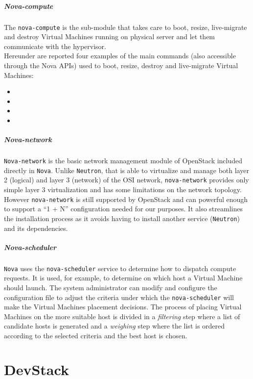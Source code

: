 \subparagraph{Nova-compute}
\label{par:openstack_nova_compute}
The \texttt{nova-compute} is the sub-module that takes care to boot, resize, live-migrate and destroy Virtual Machines running on physical server and let them communicate with the hypervisor.\\
Hereunder are reported four examples of the main commands (also accessible through the Nova APIs) used to boot, resize, destroy and live-migrate Virtual Machines:
\begin{itemize}
	\item {}
	\item {}
	\item {}
	\item {}
\end{itemize}

\subparagraph{Nova-network}
\label{par:openstack_nova_net}
\texttt{Nova-network} is the basic network management module of OpenStack included directly in \texttt{Nova}. Unlike \texttt{Neutron}, that is able to virtualize and manage both layer 2 (logical) and layer 3 (network) of the OSI network, \texttt{nova-network} provides only simple layer 3 virtualization and has some limitations on the network topology.\\
However \texttt{nova-network} is still supported by OpenStack and can powerful enough to support a ``1 + N'' configuration needed for our purposes. It also streamlines the installation process as it avoids having to install another service (\texttt{Neutron}) and its dependencies.

\subparagraph{Nova-scheduler}
\label{par:openstack_nova_sched}
\texttt{Nova} uses the \texttt{nova-scheduler} service to determine how to dispatch compute requests. It is used, for example, to determine on which host a Virtual Machine should launch. The system administrator can modify and configure the  configuration file to adjust the criteria under which the \texttt{nova-scheduler} will make the Virtual Machines placement decisions. The process of placing Virtual Machines on the more suitable host is divided in a \textit{filtering} step where a list of candidate hosts is generated and a \textit{weighing} step where the list is ordered according to the selected criteria and the best host is chosen.

\section{DevStack}
\label{sec:devstack}

